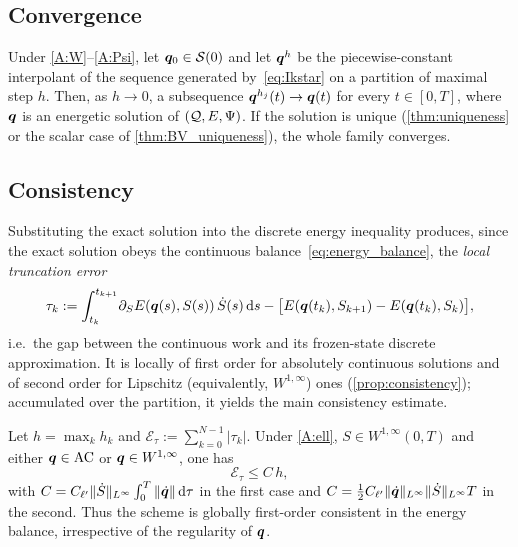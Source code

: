 \subsection{Convergence}\label{sec:convergence}

\begin{theorem}\label{thm:convergence}
Under \ref{A:W}--\ref{A:Psi}, let $\bm{q}_0\in\mathcal S(0)$ and let
$\bm{q}^h$ be the piecewise-constant interpolant of the sequence
generated by~\eqref{eq:Ikstar} on a partition of maximal step $h$.
Then, as $h\to0$, a subsequence $\bm{q}^{h_j}(t)\to\bm{q}(t)$ for every
$t\in[0,T]$, where $\bm{q}$ is an energetic solution of $(\mathcal{Q},E,\Psi)$.
If the solution is unique (\cref{thm:uniqueness} or the scalar case of
\cref{thm:BV_uniqueness}), the whole family converges.
\end{theorem}

\subsection{Consistency}\label{sec:consistency}

Substituting the exact solution into the discrete energy inequality
produces, since the exact solution obeys the continuous
balance~\eqref{eq:energy_balance}, the \emph{local truncation error}
\begin{equation}\label{eq:truncation}
  \tau_k := \int_{t_k}^{t_{k+1}}\!\partial_S E(\bm{q}(s),S(s))\,\dot S(s)\mathop{}\!\mathrm{d} s
  -\bigl[E(\bm{q}(t_k),S_{k+1})-E(\bm{q}(t_k),S_k)\bigr],
\end{equation}
i.e.\ the gap between the continuous work and its frozen-state discrete
approximation. It is locally of first order for absolutely continuous
solutions and of second order for Lipschitz (equivalently,
$W^{1,\infty}$) ones (\cref{prop:consistency}); accumulated over the
partition, it yields the main consistency estimate.

\begin{theorem}\label{thm:global_consistency}
Let $h=\max_k h_k$ and $\mathcal E_\tau:=\sum_{k=0}^{N-1}|\tau_k|$.
Under \ref{A:ell}, $S\in W^{1,\infty}(0,T)$ and either
$\bm{q}\in\mathrm{AC}$ or $\bm{q}\in W^{1,\infty}$, one has
\begin{equation}\label{eq:global_cons}
  \mathcal E_\tau\le C\,h,
\end{equation}
with $C=C_{\ell'}\|\dot S\|_{L^\infty}\int_0^T\|\dot{\bm{q}}\|\mathop{}\!\mathrm{d}\tau$ in
the first case and $C=\tfrac12 C_{\ell'}\|\dot{\bm{q}}\|_{L^\infty}
\|\dot S\|_{L^\infty}T$ in the second. Thus the scheme is globally
first-order consistent in the energy balance, irrespective of the
regularity of $\bm{q}$.
\end{theorem}

